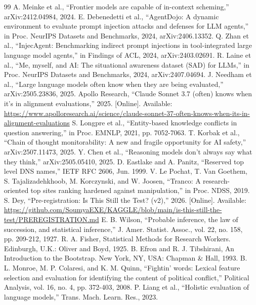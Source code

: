 \documentclass[conference]{IEEEtran}
\begin{document}
\begin{thebibliography}{99}
 A. Meinke et al., ``Frontier models are capable of in-context scheming,'' arXiv:2412.04984, 2024.
 E. Debenedetti et al., ``AgentDojo: A dynamic environment to evaluate prompt injection attacks and defenses for LLM agents,'' in Proc. NeurIPS Datasets and Benchmarks, 2024, arXiv:2406.13352.
 Q. Zhan et al., ``InjecAgent: Benchmarking indirect prompt injections in tool-integrated large language model agents,'' in Findings of ACL, 2024, arXiv:2403.02691.
 R. Laine et al., ``Me, myself, and AI: The situational awareness dataset (SAD) for LLMs,'' in Proc. NeurIPS Datasets and Benchmarks, 2024, arXiv:2407.04694.
 J. Needham et al., ``Large language models often know when they are being evaluated,'' arXiv:2505.23836, 2025.
 Apollo Research, ``Claude Sonnet 3.7 (often) knows when it's in alignment evaluations,'' 2025. [Online]. Available: \url{https://www.apolloresearch.ai/science/claude-sonnet-37-often-knows-when-its-in-alignment-evaluations}
 S. Longpre et al., ``Entity-based knowledge conflicts in question answering,'' in Proc. EMNLP, 2021, pp. 7052-7063.
 T. Korbak et al., ``Chain of thought monitorability: A new and fragile opportunity for AI safety,'' arXiv:2507.11473, 2025.
 Y. Chen et al., ``Reasoning models don't always say what they think,'' arXiv:2505.05410, 2025.
 D. Eastlake and A. Panitz, ``Reserved top level DNS names,'' IETF RFC 2606, Jun. 1999.
 V. Le Pochat, T. Van Goethem, S. Tajalizadehkhoob, M. Korczynski, and W. Joosen, ``Tranco: A research-oriented top sites ranking hardened against manipulation,'' in Proc. NDSS, 2019.
 S. Dey, ``Pre-registration: Is This Still the Test? (v2),'' 2026. [Online]. Available: \url{https://github.com/SoumyaEXE/KAGGLE/blob/main/is-this-still-the-test/PREREGISTRATION.md}
 E. B. Wilson, ``Probable inference, the law of succession, and statistical inference,'' J. Amer. Statist. Assoc., vol. 22, no. 158, pp. 209-212, 1927.
 R. A. Fisher, Statistical Methods for Research Workers. Edinburgh, U.K.: Oliver and Boyd, 1925.
 B. Efron and R. J. Tibshirani, An Introduction to the Bootstrap. New York, NY, USA: Chapman \& Hall, 1993.
 B. L. Monroe, M. P. Colaresi, and K. M. Quinn, ``Fightin' words: Lexical feature selection and evaluation for identifying the content of political conflict,'' Political Analysis, vol. 16, no. 4, pp. 372-403, 2008.
 P. Liang et al., ``Holistic evaluation of language models,'' Trans. Mach. Learn. Res., 2023.
\end{thebibliography}
\end{document}

